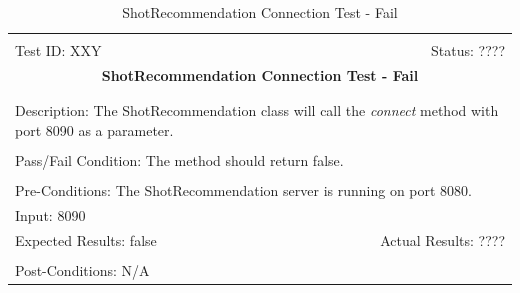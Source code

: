 \documentclass[11pt]{article}
\begin{document}
\begin{center}
\begin{table}[H]
\begin{tabular}{|l r|}\hline&\\[-2mm]
	Test ID: XXY	&Status: ????\\[-3mm]
	\multicolumn{2}{|c|}{\textbf{\large{ShotRecommendation Connection Test - Fail}}}\\&\\\hline&\\[-3mm]
	\multicolumn{2}{|p{\textwidth}|}{Description: The ShotRecommendation class will call the \textit{connect} method with port 8090 as a parameter.}\\[1mm]\hline&\\[-3mm]
	\multicolumn{2}{|p{\textwidth}|}{Pass/Fail Condition: The method should return false.}\\[1mm]\hline&\\[-3mm]
	\multicolumn{2}{|p{\textwidth}|}{Pre-Conditions: The ShotRecommendation server is running on port 8080.}\\[4mm]
	\multicolumn{2}{|p{\textwidth}|}{Input: 8090}\\[2mm]\hline
	\multicolumn{1}{|p{0.49\textwidth}}{Expected Results: false}	&\multicolumn{1}{|p{0.45\textwidth}|}{Actual Results: ????}\\\hline&\\[-3mm]
	\multicolumn{2}{|p{\textwidth}|}{Post-Conditions: N/A}\\\hline
\end{tabular}
\caption{ShotRecommendation Connection Test - Fail}
\end{table}
\end{center}
\end{document}
